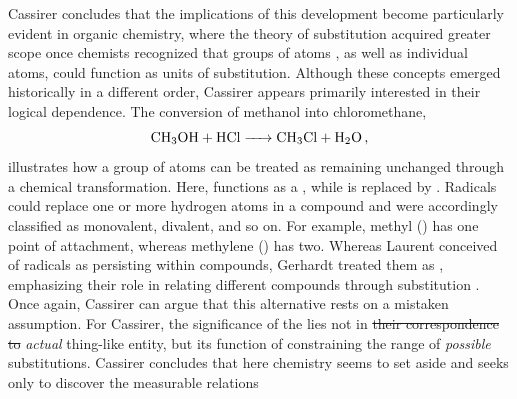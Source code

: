 \documentclass[submitted,12pt]{article}
\providecommand{\DIFadd}[1]{{\protect\color{blue}\uwave{#1}}} %
\providecommand{\DIFdel}[1]{{\protect\color{red}\sout{#1}}}                      %
\providecommand{\DIFaddbegin}{} %
\providecommand{\DIFaddend}{} %
\providecommand{\DIFdelbegin}{} %
\providecommand{\DIFdelend}{} %
\begin{document}
Cassirer concludes that the implications of this development become particularly evident in organic chemistry, where the theory of substitution acquired greater scope once chemists recognized that groups of atoms , as well as individual atoms, could function as units of substitution. Although these concepts emerged historically in a different order, Cassirer appears primarily interested in their logical dependence. The conversion of methanol into chloromethane, $$\ce{CH3OH + HCl -> CH3Cl + H2O}\,,$$ illustrates how a group of atoms can be treated as remaining unchanged through a chemical transformation. Here,  functions as a  , while  is replaced by . Radicals could replace one or more hydrogen atoms in a compound and were accordingly classified as monovalent, divalent, and so on. For example, methyl () has one point of attachment, whereas methylene () has two. Whereas Laurent conceived of radicals as  persisting within compounds, Gerhardt treated them as , emphasizing their role in relating different compounds through substitution . Once again, Cassirer can argue that this alternative \citep[175, 189ff.]{Ladenburg1902} rests on a mistaken assumption. For Cassirer, the significance of the   lies not in \DIFdelbegin \DIFdel{their correspondence to }\DIFdelend \DIFaddbegin \DIFadd{its correspondence to an }\DIFaddend \emph{actual} thing-like entity, but \DIFaddbegin \DIFadd{in }\DIFaddend its function of constraining the range of \emph{possible} substitutions. Cassirer concludes that here chemistry seems to set aside  and seeks only to discover the measurable relations  \SF{286--87}{215--16}\DIFaddbegin \DIFadd{.
}\DIFaddend 

\end{document}
